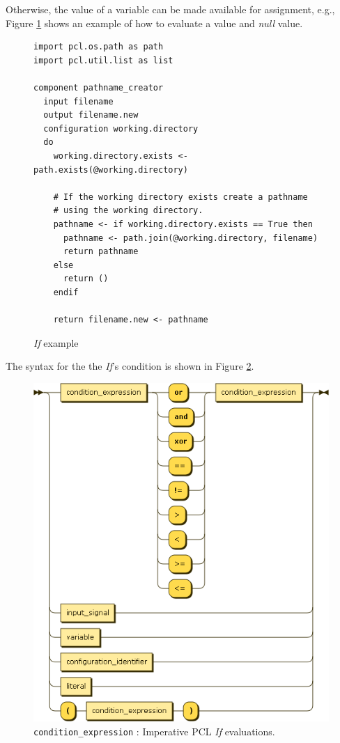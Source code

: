 Otherwise, the value of a variable can be made available for assignment, e.g., Figure \ref{fig:imperative-pcl-if-example} shows an example of how to evaluate a value and \emph{null} value.
\begin{figure}[h!]
  \begin{verbatim}
import pcl.os.path as path
import pcl.util.list as list

component pathname_creator
  input filename
  output filename.new
  configuration working.directory
  do
    working.directory.exists <- path.exists(@working.directory)

    # If the working directory exists create a pathname
    # using the working directory.
    pathname <- if working.directory.exists == True then
      pathname <- path.join(@working.directory, filename)
      return pathname
    else
      return ()
    endif

    return filename.new <- pathname
  \end{verbatim}
  \caption{\emph{If} example}
  \label{fig:imperative-pcl-if-example}
\end{figure}
The syntax for the the \emph{If}'s condition is shown in Figure \ref{fig:imperative-pcl-if-condition}.
\begin{figure}[h!]
  \centering
    \includegraphics[scale=\DiagramScale]{chapters/adapter/diagrams/condition_expression}
  \caption{\texttt{condition\_expression} : Imperative PCL \emph{If} evaluations.}
  \label{fig:imperative-pcl-if-condition}
\end{figure}


